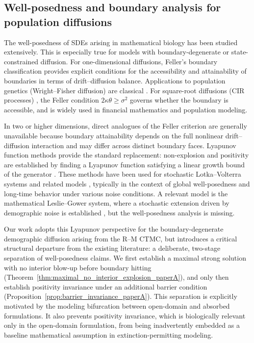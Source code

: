 \documentclass[pdflatex,sn-mathphys-ay]{sn-jnl}
\theoremstyle{thmstyleone}
\theoremstyle{definition}
\theoremstyle{remark}
\begin{document}
\subsection{Well-posedness and boundary analysis for population diffusions}

The well-posedness of SDEs arising in mathematical biology has been studied extensively. This is especially true for models with boundary-degenerate or state-constrained diffusion.  
For one-dimensional diffusions, Feller's boundary classification \citep{feller_parabolic_1952,feller_diffusion_1954} provides explicit conditions for the accessibility and attainability of boundaries in terms of drift--diffusion balance. 
Applications to population genetics (Wright--Fisher diffusion) are classical \citep{ethier_markov_1986,hofrichter_diffusion_2014,ewens_mathematical_2004}. 
For square-root diffusions (CIR processes) \citep{cox_theory_1985}, the Feller condition $2\kappa\theta\ge\sigma^2$ governs whether the boundary is accessible, and is widely used in financial mathematics and population modeling.

In two or higher dimensions, direct analogues of the Feller criterion are generally unavailable because boundary attainability depends on the full nonlinear drift--diffusion interaction and may differ across distinct boundary faces. 
Lyapunov function methods provide the standard replacement: non-explosion and positivity are established by finding a Lyapunov function satisfying a linear growth bound of the generator \citep{khasminskii_stochastic_2012,meyn_stability_1993,mao_stochastic_2008}. 
These methods have been used for stochastic Lotka--Volterra systems and related models \citep{cui_long-term_2026,zhao_stochastic_2024,zhan_dynamical_2024,liu_asymptotic_2020}, typically in the context of global well-posedness and long-time behavior under various noise conditions. A relevant model is the mathematical Leslie–Gower system, where a stochastic extension driven by demographic noise is established \citep{wang_algebraicspectral_2026}, but the well-posedness analysis is missing.  

Our work adopts this Lyapunov perspective for the boundary-degenerate demographic diffusion arising from the R--M CTMC, but introduces a critical structural departure from the existing literature: a deliberate, two-stage separation of well-posedness claims.
We first establish a maximal strong solution with no interior blow-up before boundary hitting (Theorem~\ref{thm:maximal_no_interior_explosion_paperA}), and only then establish positivity invariance under an additional barrier condition (Proposition~\ref{prop:barrier_invariance_paperA}). 
This separation is explicitly motivated by the modeling bifurcation between open-domain and absorbed formulations.
It also prevents positivity invariance, which is biologically relevant only in the open-domain formulation, from being inadvertently embedded as a baseline mathematical assumption in extinction-permitting modeling.
\end{document}

